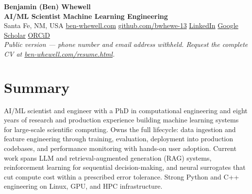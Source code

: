 \documentclass[10.5pt,letterpaper]{article}
\begin{document}
\begin{center}
  {\LARGE\bfseries Benjamin (Ben) Whewell}\\[3pt]
  {\color{accent}\bfseries AI/ML Scientist \textperiodcentered{} Machine Learning Engineering}\\[4pt]
  {\small Santa Fe, NM, USA \textperiodcentered{}
   \href{https://www.ben-whewell.com}{ben-whewell.com} \textperiodcentered{}
   \href{https://github.com/bwhewe-13}{github.com/bwhewe-13} \textperiodcentered{}
   \href{https://www.linkedin.com/in/ben-whewell-133935137/}{LinkedIn} \textperiodcentered{}
   \href{https://scholar.google.com/citations?user=e4PPMC0AAAAJ}{Google Scholar} \textperiodcentered{}
   \href{https://orcid.org/0000-0001-7826-5525}{ORCiD}}\\[3pt]
  {\footnotesize\itshape\color{muted} Public version --- phone number and email address withheld.
   Request the complete CV at \href{https://www.ben-whewell.com/resume.html}{ben-whewell.com/resume.html}.}
\end{center}

\section{Summary}
AI/ML scientist and engineer with a PhD in computational engineering and eight years of
research and production experience building machine learning systems for large-scale
scientific computing. Owns the full lifecycle: data ingestion and feature engineering
through training, evaluation, deployment into production codebases, and performance
monitoring with hands-on user adoption. Current work spans LLM and retrieval-augmented
generation (RAG) systems, reinforcement learning for sequential decision-making, and neural
surrogates that cut compute cost within a prescribed error tolerance. Strong Python and C++
engineering on Linux, GPU, and HPC infrastructure.

\end{document}
